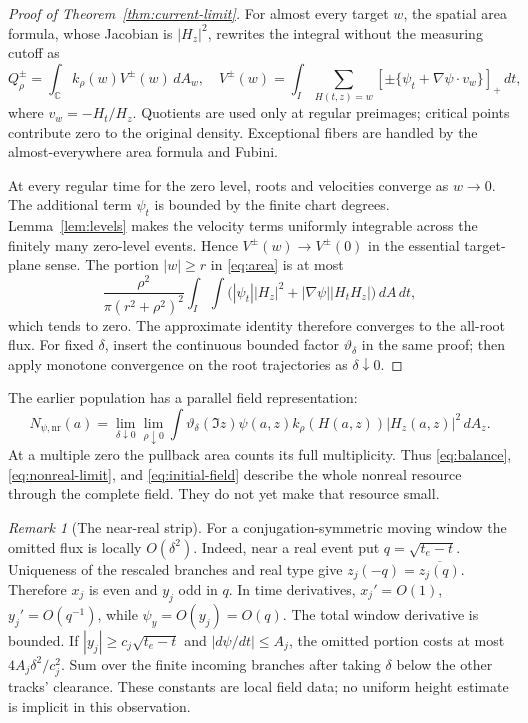 \documentclass[11pt]{article}
\newcommand{\C}{\mathbb C}
\newcommand{\dd}{\,d}
\newcommand{\nr}{\mathrm{nr}}
\theoremstyle{remark}
\newtheorem{remark}[theorem]{Remark}
\begin{document}
\begin{proof}[Proof of Theorem~\ref{thm:current-limit}]
For almost every target $w$, the spatial area formula, whose Jacobian
is $|H_z|^2$, rewrites the integral without the measuring cutoff as
\begin{equation}
 Q_\rho^{\pm}=\int_\C k_\rho(w)V^{\pm}(w)\dd A_w,
 \quad
 V^{\pm}(w)=\int_I\sum_{H(t,z)=w}
 [\pm\{\psi_t+\nabla\psi\cdot v_w\}]_+\dd t,
 \label{eq:area}
\end{equation}
where $v_w=-H_t/H_z$. Quotients are used only at regular preimages;
critical points contribute zero to the original density. Exceptional
fibers are handled by the almost-everywhere area formula and Fubini.

At every regular time for the zero level, roots and velocities converge
as $w\to0$. The additional term $\psi_t$ is bounded by the finite chart
degrees. Lemma~\ref{lem:levels} makes the velocity terms uniformly
integrable across the finitely many zero-level events. Hence
$V^{\pm}(w)\to V^{\pm}(0)$ in the essential target-plane sense. The
portion $|w|\ge r$ in \eqref{eq:area} is at most
\[
 \frac{\rho^2}{\pi(r^2+\rho^2)^2}
 \int_I\int\bigl(|\psi_t||H_z|^2+
                   |\nabla\psi||H_tH_z|\bigr)\dd A\dd t,
\]
which tends to zero. The approximate identity therefore converges to
the all-root flux. For fixed $\delta$, insert the continuous bounded
factor $\vartheta_\delta$ in the same proof; then apply monotone
convergence on the root trajectories as $\delta\downarrow0$.
\end{proof}

The earlier population has a parallel field representation:
\begin{equation}
 N_{\psi,\nr}(a)=
 \lim_{\delta\downarrow0}\lim_{\rho\downarrow0}
 \int\vartheta_\delta(\Im z)\psi(a,z)
                   k_\rho(H(a,z))|H_z(a,z)|^2\dd A_z.
 \label{eq:initial-field}
\end{equation}
At a multiple zero the pullback area counts its full multiplicity.
Thus \eqref{eq:balance}, \eqref{eq:nonreal-limit}, and
\eqref{eq:initial-field} describe the whole nonreal resource through
the complete field. They do not yet make that resource small.

\begin{remark}[The near-real strip]
For a conjugation-symmetric moving window the omitted flux is locally
$O(\delta^2)$. Indeed, near a real event put $q=\sqrt{t_e-t}$.
Uniqueness of the rescaled branches and real type give
$z_j(-q)=\overline{z_j(q)}$. Therefore $x_j$ is even and $y_j$ odd
in $q$. In time derivatives, $x_j'=O(1)$,
$y_j'=O(q^{-1})$, while $\psi_y=O(y_j)=O(q)$.
The total window derivative is bounded. If
$|y_j|\ge c_j\sqrt{t_e-t}$ and $|d\psi/dt|\le A_j$, the omitted
portion costs at most $4A_j\delta^2/c_j^2$. Sum over the finite incoming
branches after taking $\delta$ below the other tracks' clearance.
These constants are local field data; no uniform height estimate is
implicit in this observation.
\end{remark}
\end{document}
